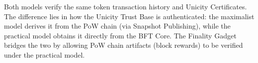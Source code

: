 Both models verify the same token transaction history and Unicity Certificates. The difference lies in how the Unicity Trust Base is authenticated: the maximalist model derives it from the PoW chain (via Snapshot Publishing), while the practical model obtains it directly from the BFT Core. The Finality Gadget bridges the two by allowing PoW chain artifacts (block rewards) to be verified under the practical model.
